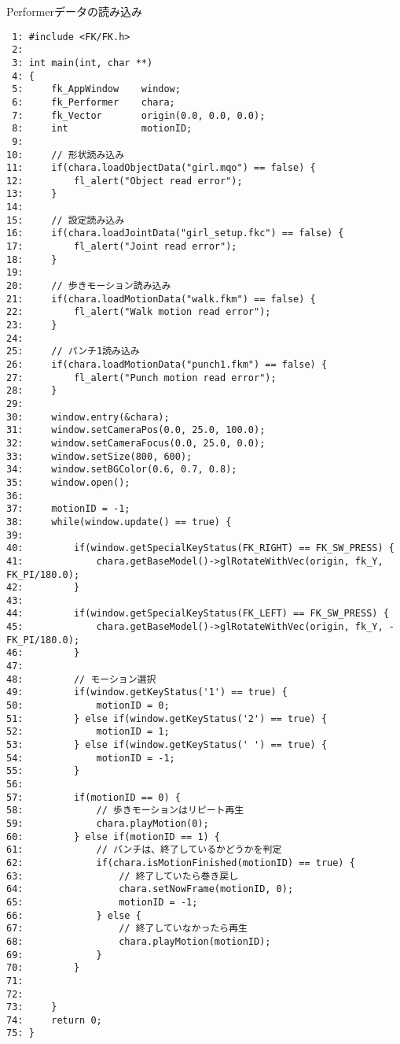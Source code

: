 \begin{itembox}[l]{Performerデータの読み込み}
\begin{scriptsize}
\begin{verbatim}
 1: #include <FK/FK.h>
 2: 
 3: int main(int, char **)
 4: {
 5:     fk_AppWindow    window;
 6:     fk_Performer    chara;
 7:     fk_Vector       origin(0.0, 0.0, 0.0);
 8:     int             motionID;
 9: 
10:     // 形状読み込み
11:     if(chara.loadObjectData("girl.mqo") == false) {
12:         fl_alert("Object read error");
13:     }
14: 
15:     // 設定読み込み
16:     if(chara.loadJointData("girl_setup.fkc") == false) {
17:         fl_alert("Joint read error");
18:     }
19: 
20:     // 歩きモーション読み込み
21:     if(chara.loadMotionData("walk.fkm") == false) {
22:         fl_alert("Walk motion read error");
23:     }
24: 
25:     // パンチ1読み込み
26:     if(chara.loadMotionData("punch1.fkm") == false) {
27:         fl_alert("Punch motion read error");
28:     }
29: 
30:     window.entry(&chara);
31:     window.setCameraPos(0.0, 25.0, 100.0);
32:     window.setCameraFocus(0.0, 25.0, 0.0);
33:     window.setSize(800, 600);
34:     window.setBGColor(0.6, 0.7, 0.8);
35:     window.open();
36: 
37:     motionID = -1;
38:     while(window.update() == true) {
39: 
40:         if(window.getSpecialKeyStatus(FK_RIGHT) == FK_SW_PRESS) {
41:             chara.getBaseModel()->glRotateWithVec(origin, fk_Y, FK_PI/180.0);
42:         }
43: 
44:         if(window.getSpecialKeyStatus(FK_LEFT) == FK_SW_PRESS) {
45:             chara.getBaseModel()->glRotateWithVec(origin, fk_Y, -FK_PI/180.0);
46:         }
47: 
48:         // モーション選択
49:         if(window.getKeyStatus('1') == true) {
50:             motionID = 0;
51:         } else if(window.getKeyStatus('2') == true) {
52:             motionID = 1;
53:         } else if(window.getKeyStatus(' ') == true) {
54:             motionID = -1;
55:         }
56: 
57:         if(motionID == 0) {
58:             // 歩きモーションはリピート再生
59:             chara.playMotion(0);
60:         } else if(motionID == 1) {
61:             // パンチは、終了しているかどうかを判定
62:             if(chara.isMotionFinished(motionID) == true) {
63:                 // 終了していたら巻き戻し
64:                 chara.setNowFrame(motionID, 0);
65:                 motionID = -1;
66:             } else {
67:                 // 終了していなかったら再生
68:                 chara.playMotion(motionID);
69:             }
70:         }
71: 
72: 
73:     }
74:     return 0;
75: }
\end{verbatim}
\end{scriptsize}
\end{itembox}
\newpage
